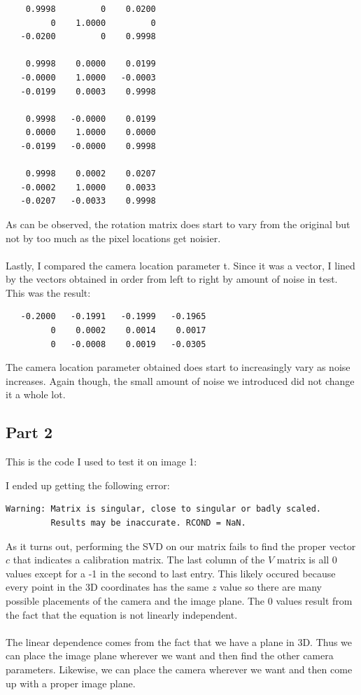 \documentclass[11pt,psfig]{article}
\begin{document}
\begin{verbatim}
    0.9998         0    0.0200
         0    1.0000         0
   -0.0200         0    0.9998

    0.9998    0.0000    0.0199
   -0.0000    1.0000   -0.0003
   -0.0199    0.0003    0.9998

    0.9998   -0.0000    0.0199
    0.0000    1.0000    0.0000
   -0.0199   -0.0000    0.9998

    0.9998    0.0002    0.0207
   -0.0002    1.0000    0.0033
   -0.0207   -0.0033    0.9998
\end{verbatim}
As can be observed, the rotation matrix does start to vary from the original but not by too much as the pixel locations get noisier. \\
\\
Lastly, I compared the camera location parameter t. Since it was a vector, I lined by the vectors obtained in order from left to right by amount of noise in test. This was the result:

\begin{verbatim}
   -0.2000   -0.1991   -0.1999   -0.1965
         0    0.0002    0.0014    0.0017
         0   -0.0008    0.0019   -0.0305
\end{verbatim} 

The camera location parameter obtained does start to increasingly vary as noise increases. Again though, the small amount of noise we introduced did not change it a whole lot. 

\subsection{Part 2}

This is the code I used to test it on image 1:

I ended up getting the following error:
\begin{verbatim}
Warning: Matrix is singular, close to singular or badly scaled.
         Results may be inaccurate. RCOND = NaN. 
\end{verbatim}
As it turns out, performing the SVD on our matrix fails to find the proper vector $c$ that indicates a calibration matrix. The last column of the $V$ matrix is all 0 values except for a -1 in the second to last entry. This likely occured because every point in the 3D coordinates has the same $z$ value so there are many possible placements of the camera and the image plane. The 0 values result from the fact that the equation is not linearly independent. \\
\\
The linear dependence comes from the fact that we have a plane in 3D. Thus we can place the image plane wherever we want and then find the other camera parameters. Likewise, we can place the camera wherever we want and then come up with a proper image plane. 
\end{document}
